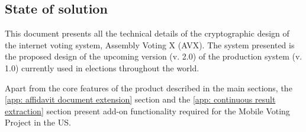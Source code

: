 \subsection{State of solution}
This document presents all the technical details of the cryptographic design of the internet voting system, Assembly Voting X (AVX). The system presented is the proposed design of the upcoming version (v. 2.0) of the production system (v. 1.0) currently used in elections throughout the world.

Apart from the core features of the product described in the main sections, the \cref{app: affidavit document extension} section and the \cref{app: continuous result extraction} section present add-on functionality required for the Mobile Voting Project \cite{Tusk} in the US.
